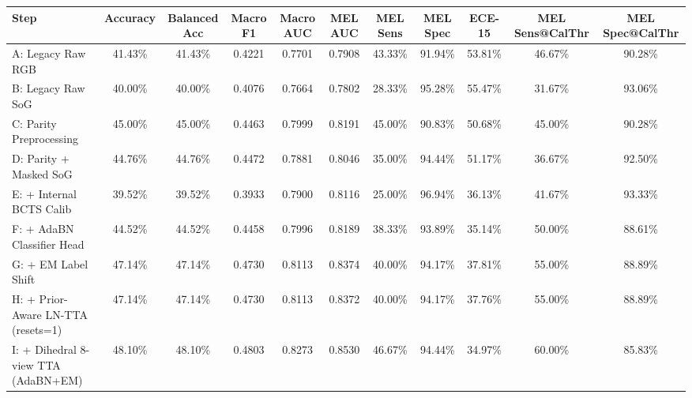 \begin{tabular}{lcccccccccc}
\toprule
Step & Accuracy & Balanced Acc & Macro F1 & Macro AUC & MEL AUC & MEL Sens & MEL Spec & ECE-15 & MEL Sens@CalThr & MEL Spec@CalThr \\
\midrule
A: Legacy Raw RGB & 41.43\% & 41.43\% & 0.4221 & 0.7701 & 0.7908 & 43.33\% & 91.94\% & 53.81\% & 46.67\% & 90.28\% \\
B: Legacy Raw SoG & 40.00\% & 40.00\% & 0.4076 & 0.7664 & 0.7802 & 28.33\% & 95.28\% & 55.47\% & 31.67\% & 93.06\% \\
C: Parity Preprocessing & 45.00\% & 45.00\% & 0.4463 & 0.7999 & 0.8191 & 45.00\% & 90.83\% & 50.68\% & 45.00\% & 90.28\% \\
D: Parity + Masked SoG & 44.76\% & 44.76\% & 0.4472 & 0.7881 & 0.8046 & 35.00\% & 94.44\% & 51.17\% & 36.67\% & 92.50\% \\
E: + Internal BCTS Calib & 39.52\% & 39.52\% & 0.3933 & 0.7900 & 0.8116 & 25.00\% & 96.94\% & 36.13\% & 41.67\% & 93.33\% \\
F: + AdaBN Classifier Head & 44.52\% & 44.52\% & 0.4458 & 0.7996 & 0.8189 & 38.33\% & 93.89\% & 35.14\% & 50.00\% & 88.61\% \\
G: + EM Label Shift & 47.14\% & 47.14\% & 0.4730 & 0.8113 & 0.8374 & 40.00\% & 94.17\% & 37.81\% & 55.00\% & 88.89\% \\
H: + Prior-Aware LN-TTA (resets=1) & 47.14\% & 47.14\% & 0.4730 & 0.8113 & 0.8372 & 40.00\% & 94.17\% & 37.76\% & 55.00\% & 88.89\% \\
I: + Dihedral 8-view TTA (AdaBN+EM) & 48.10\% & 48.10\% & 0.4803 & 0.8273 & 0.8530 & 46.67\% & 94.44\% & 34.97\% & 60.00\% & 85.83\% \\
\bottomrule
\end{tabular}
